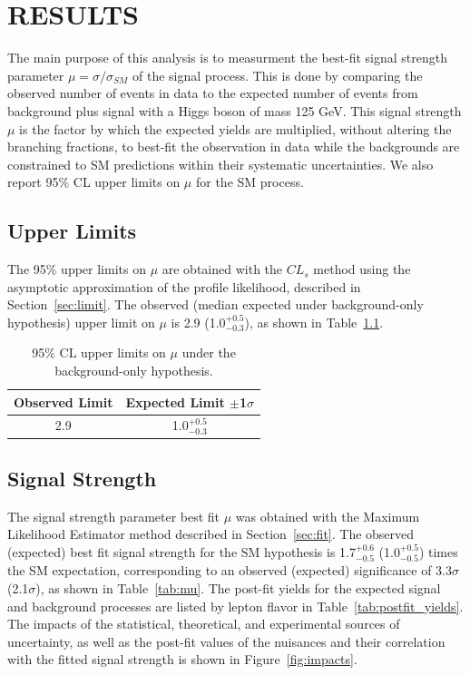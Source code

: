 %
%

\chapter{RESULTS}
\label{chap:results}
The main purpose of this analysis is to measurment the best-fit signal strength parameter $\mu = \sigma/\sigma_{SM}$ of the \tth signal process.
This is done by comparing the observed number of events in data to the expected number of events from background plus \tth signal with a Higgs boson of mass 125 GeV. 
This signal strength $\mu$ is the factor by which the expected \tth yields are multiplied, without altering the branching fractions, to best-fit the observation in data
while the backgrounds are constrained to SM predictions within their systematic uncertainties. We also report 95$\%$ CL upper limits on $\mu$ for the SM \tth process.

\section{Upper Limits}
The 95$\%$ upper limits on $\mu$ are obtained with the $CL_{s}$ method using the asymptotic approximation of the profile likelihood, described in Section~\ref{sec:limit}.
The observed (median expected under background-only hypothesis) upper limit on $\mu$ is 2.9 (1.0$^{+0.5}_{-0.3}$), as shown in Table~\ref{tab:limits}.

\begin{table}[htbp]
\begin{center}
  \caption[Table of Final Limits]{95$\%$ CL upper limits on $\mu$ under the background-only hypothesis.}
    \begin{tabular}{c c} \hline
      Observed Limit & Expected Limit $\pm$1$\sigma$  \\ \hline 
      2.9 & 1.0$^{+0.5}_{-0.3}$  \\
      \hline
    \end{tabular}
    \label{tab:limits}
\end{center}
\end{table}

\section{Signal Strength}
The signal strength parameter best fit $\mu$ was obtained with the Maximum Likelihood Estimator method described in Section~\ref{sec:fit}.
The observed (expected) best fit signal strength for the SM \tth hypothesis is 1.7$^{+0.6}_{-0.5}$ (1.0$^{+0.5}_{-0.5}$) times the SM expectation,
corresponding to an observed (expected) significance of 3.3$\sigma$ (2.1$\sigma$), as shown in Table~\ref{tab:mu}.
The post-fit yields for the expected signal and background processes are listed by lepton flavor in Table~\ref{tab:postfit_yields}.
The impacts of the statistical, theoretical, and experimental sources of uncertainty, as well as the post-fit values of the nuisances and their correlation with
the fitted signal strength is shown in Figure~\ref{fig:impacts}.

